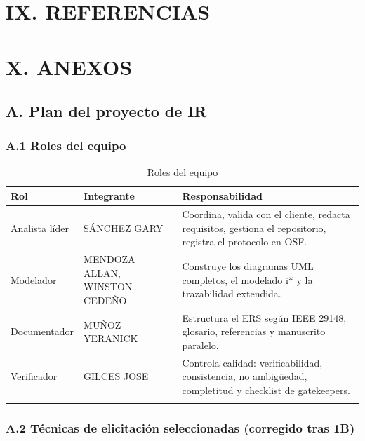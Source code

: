 \section*{IX. REFERENCIAS}


\nocite{*}



\section*{X. ANEXOS}


\subsection*{A. Plan del proyecto de IR}


\subsubsection*{A.1 Roles del equipo}


\begingroup
\small
\begin{longtable}{|p{5.2cm}|p{5.2cm}|p{5.2cm}|}
\hline
Rol & Integrante & Responsabilidad \\ \hline
Analista líder & SÁNCHEZ GARY & Coordina, valida con el cliente, redacta requisitos, gestiona el repositorio, registra el protocolo en OSF. \\ \hline
Modelador & MENDOZA ALLAN, WINSTON CEDEÑO & Construye los diagramas UML completos, el modelado i* y la trazabilidad extendida. \\ \hline
Documentador & MUÑOZ YERANICK & Estructura el ERS según IEEE 29148, glosario, referencias y manuscrito paralelo. \\ \hline
Verificador & GILCES JOSE & Controla calidad: verificabilidad, consistencia, no ambigüedad, completitud y checklist de gatekeepers. \\ \hline
\caption{Roles del equipo}
\end{longtable}
\endgroup

\subsubsection*{A.2 Técnicas de elicitación seleccionadas (corregido tras 1B)}


